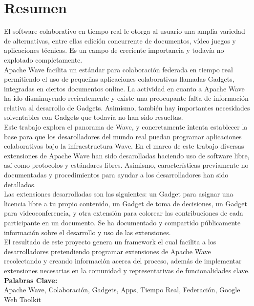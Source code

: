 \chapter*{Resumen}
El software colaborativo en tiempo real le otorga al usuario una amplia variedad de alternativas, entre ellas edición concurrente de documentos, vídeo juegos y aplicaciones técnicas. Es un campo de creciente importancia y todavía no explotado completamente.\\[.2cm]
Apache Wave facilita un estándar para colaboración federada en tiempo real permitiendo el uso de pequeñas aplicaciones colaborativas llamadas Gadgets, integradas en ciertos documentos online. La actividad en cuanto a Apache Wave ha ido disminuyendo recientemente y existe una preocupante falta de información relativa al desarrollo de Gadgets. Asimismo, también hay importantes necesidades solventables con Gadgets que todavía no han sido resueltas.\\[.2cm]
Este trabajo explora el panorama de Wave, y concretamente intenta establecer la base para que los desarolladores del mundo real puedan programar aplicaciones colaborativas bajo la infraestructura Wave. En el marco de este trabajo diversas extensiones de Apache Wave han sido desarolladas haciendo uso de software libre, así como protocolos y estándares libres. Asimismo, características previamente no documentadas y procedimientos para ayudar a los desarrolladores han sido detallados.\\[.2cm]
Las extensiones desarrolladas son las siguientes: un Gadget para asignar una licencia libre a tu propio contenido, un Gadget de toma de decisiones, un Gadget para videoconferencia, y otra extensión para colorear las contribuciones de cada participante en un documento. Se ha documentado y compartido públicamente información sobre el desarrollo y uso de las extensiones.\\[.2cm]
El resultado de este proyecto genera un framework el cual facilita a los desarrolladores pretendiendo programar extensiones de Apache Wave recolectando y creando información acerca del proceso, además de implementar extensiones necesarias en la comunidad y representativas de funcionalidades clave.
\vfill
{\large \bf Palabras Clave:}\\
{\large Apache Wave, Colaboración, Gadgets, Apps, Tiempo Real, Federación, Google Web Toolkit}

\newpage
\thispagestyle{empty}
\mbox{}

